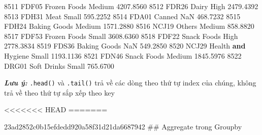 \documentclass[
]{book}
\makeatletter
\newenvironment{Shaded}{\begin{snugshade}}{\end{snugshade}}
\newcommand{\DecValTok}[1]{\textcolor[rgb]{0.00,0.00,0.81}{#1}}
\newcommand{\FloatTok}[1]{\textcolor[rgb]{0.00,0.00,0.81}{#1}}
\newcommand{\KeywordTok}[1]{\textcolor[rgb]{0.13,0.29,0.53}{\textbf{#1}}}
\newcommand{\NormalTok}[1]{#1}
\renewenvironment{quote}{\begin{VF}}{\end{VF}}
\newenvironment{kframe}{%
\medskip{}
\setlength{\fboxsep}{.8em}
 \def\at@end@of@kframe{}%
 \ifinner\ifhmode%
  \def\at@end@of@kframe{\end{minipage}}%
  \begin{minipage}{\columnwidth}%
 \fi\fi%
 \def\FrameCommand##1{\hskip\@totalleftmargin \hskip-\fboxsep
 \colorbox{shadecolor}{##1}\hskip-\fboxsep
     \hskip-\linewidth \hskip-\@totalleftmargin \hskip\columnwidth}%
 \MakeFramed {\advance\hsize-\width
   \@totalleftmargin\z@ \linewidth\hsize
   \@setminipage}}%
 {\par\unskip\endMakeFramed%
 \at@end@of@kframe}
\newenvironment{rmdblock}[1]
  {
  \begin{itemize}
  \renewcommand{\labelitemi}{
    \raisebox{-.7\height}[0pt][0pt]{
      {\setkeys{Gin}{width=3em,keepaspectratio}\texttt{[image: images/\#1]}}
    }
  }
  \setlength{\fboxsep}{1em}
  \begin{kframe}
  \item
  }
  {
  \end{kframe}
  \end{itemize}
  }
\newenvironment{rmdnote}
  {\begin{rmdblock}{note}}
  {\end{rmdblock}}
\makeatother
\begin{document}
\begin{Shaded}
\begin{Highlighting}[]
\DecValTok{8511}\NormalTok{           FDF05           Frozen Foods      Medium          }\FloatTok{4207.8560}
\DecValTok{8512}\NormalTok{           FDR26                  Dairy        High          }\FloatTok{2479.4392}
\DecValTok{8513}\NormalTok{           FDH31                   Meat       Small           }\FloatTok{595.2252}
\DecValTok{8514}\NormalTok{           FDA01                 Canned         NaN           }\FloatTok{468.7232}
\DecValTok{8515}\NormalTok{           FDH24           Baking Goods      Medium          }\FloatTok{1571.2880}
\DecValTok{8516}\NormalTok{           NCJ19                 Others      Medium           }\FloatTok{858.8820}
\DecValTok{8517}\NormalTok{           FDF53           Frozen Foods       Small          }\FloatTok{3608.6360}
\DecValTok{8518}\NormalTok{           FDF22            Snack Foods        High          }\FloatTok{2778.3834}
\DecValTok{8519}\NormalTok{           FDS36           Baking Goods         NaN           }\FloatTok{549.2850}
\DecValTok{8520}\NormalTok{           NCJ29     Health }\KeywordTok{and}\NormalTok{ Hygiene       Small          }\FloatTok{1193.1136}
\DecValTok{8521}\NormalTok{           FDN46            Snack Foods      Medium          }\FloatTok{1845.5976}
\DecValTok{8522}\NormalTok{           DRG01            Soft Drinks       Small           }\FloatTok{765.6700}
\end{Highlighting}
\end{Shaded}

\begin{rmdnote}
\textbf{\emph{Lưu ý:}}
\texttt{.head()} và \texttt{.tail()} trả về các dòng theo thứ tự index của chúng, không trả về theo thứ tự sắp xếp theo key
\end{rmdnote}
\textless\textless\textless\textless\textless\textless\textless{} HEAD
=======

\begin{quote}
\begin{quote}
\begin{quote}
\begin{quote}
\begin{quote}
\begin{quote}
\begin{quote}
23ad2852c0b15efdedd920a58f31d21da6687942
\#\# Aggregate trong Groupby
\end{quote}
\end{quote}
\end{quote}
\end{quote}
\end{quote}
\end{quote}
\end{quote}
\end{document}
